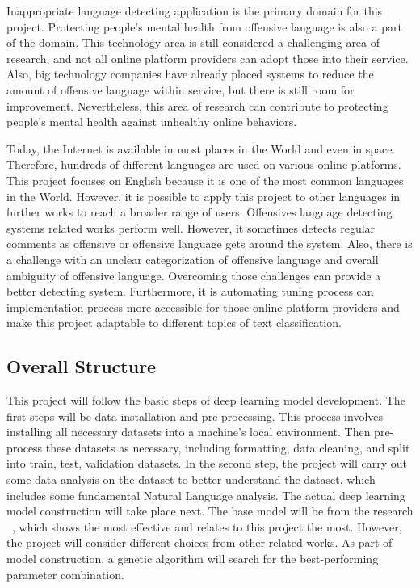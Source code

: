 \documentclass[12pt, natbib=false]{article}
\begin{document}
Inappropriate language detecting application is the primary domain for this project.
Protecting people’s mental health from offensive language is also a part of the domain.
This technology area is still considered a challenging area of research, and not all online platform providers can adopt those into their service.
Also, big technology companies have already placed systems to reduce the amount of offensive language within service, but there is still room for improvement.
Nevertheless, this area of research can contribute to protecting people’s mental health against unhealthy online behaviors. 

Today, the Internet is available in most places in the World and even in space.
Therefore, hundreds of different languages are used on various online platforms.
This project focuses on English because it is one of the most common languages in the World.
However, it is possible to apply this project to other languages in further works to reach a broader range of users.
Offensives language detecting systems related works perform well.
However, it sometimes detects regular comments as offensive or offensive language gets around the system.
Also, there is a challenge with an unclear categorization of offensive language and overall ambiguity of offensive language.
Overcoming those challenges can provide a better detecting system.
Furthermore, it is automating tuning process can implementation process more accessible for those online platform providers and make this project adaptable to different topics of text classification. 

\subsection{Overall Structure}
This project will follow the basic steps of deep learning model development.
The first steps will be data installation and pre-processing.
This process involves installing all necessary datasets into a machine’s local environment.
Then pre-process these datasets as necessary, including formatting, data cleaning, and split into train, test, validation datasets.
In the second step, the project will carry out some data analysis on the dataset to better understand the dataset, which includes some fundamental Natural Language analysis.
The actual deep learning model construction will take place next.
The base model will be from the research ~\cite{hada2021ruddit}, which shows the most effective and relates to this project the most.
However, the project will consider different choices from other related works.
As part of model construction, a genetic algorithm will search for the best-performing parameter combination. 
\end{document}
